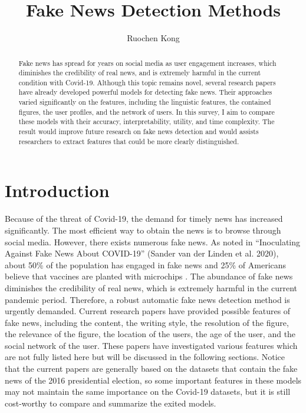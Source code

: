 \documentclass[sigconf ,nonacm]{acmart}
\begin{document}
\title{Fake News Detection Methods}

\author{Ruochen Kong}

\begin{abstract}
Fake news has spread for years on social media as user engagement increases, which diminishes the credibility of real news, and is extremely harmful in the current condition with Covid-19. Although this topic remains novel, several research papers have already developed powerful models for detecting fake news. Their approaches varied significantly on the features, including the linguistic features, the contained figures, the user profiles, and the network of users. In this survey, I aim to compare these models with their accuracy, interpretability, utility, and time complexity. The result would improve future research on fake news detection and would assists researchers to extract features that could be more clearly distinguished. 
\end{abstract}

\maketitle
\section{Introduction}
Because of the threat of Covid-19, the demand for timely news has increased significantly. The most efficient way to obtain the news is to browse through social media. However, there exists numerous fake news. As noted in ``Inoculating Against Fake News About COVID-19'' (Sander van der Linden et al. 2020), about 50\% of the population has engaged in fake news and 25\% of Americans believe that vaccines are planted with microchips \cite{covid-fake}. The abundance of fake news diminishes the credibility of real news, which is extremely harmful in the current pandemic period. Therefore, a robust automatic fake news detection method is urgently demanded. Current research papers have provided possible features of fake news, including the content, the writing style, the resolution of the figure, the relevance of the figure, the location of the users, the age of the user, and the social network of the user.  These papers have investigated various features which are not fully listed here but will be discussed in the following sections. Notice that the current papers are generally based on the datasets that contain the fake news of the 2016 presidential election, so some important features in these models may not maintain the same importance on the Covid-19 datasets, but it is still cost-worthy to compare and summarize the exited models.
\end{document}
